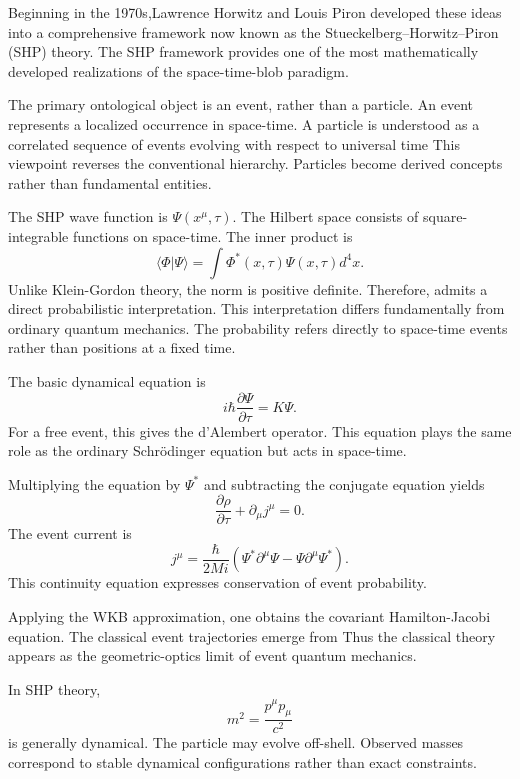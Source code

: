 Beginning in the 1970s,Lawrence Horwitz and Louis Piron developed these 
ideas into a comprehensive framework now known as the 
Stueckelberg--Horwitz--Piron (SHP) theory.
The SHP framework provides one of the most mathematically developed realizations
of the space-time-blob paradigm.

The primary ontological object is an event,
rather than a particle.
An event represents a localized occurrence in space-time.
A particle is understood as a correlated sequence of events evolving with respect to universal time
This viewpoint reverses the conventional hierarchy.
Particles become derived concepts rather than fundamental entities.

The SHP wave function is $\Psi(x^\mu,\tau).$
The Hilbert space consists of square-integrable functions on space-time.
The inner product is
\[
\langle \Phi | \Psi \rangle = \int \Phi^*(x,\tau)\Psi(x,\tau)d^4x.
\]
Unlike Klein-Gordon theory, the norm is positive definite.
Therefore,
admits a direct probabilistic interpretation.
This interpretation differs fundamentally from ordinary quantum mechanics.
The probability refers directly to space-time events rather than positions 
at a fixed time.

The basic dynamical equation is
\begin{equation}
    \label{shp-sch}
i\hbar \frac{\partial \Psi}{\partial \tau} = K \Psi.
\end{equation}
For a free event,
this gives the d'Alembert operator.
This equation plays the same role as the ordinary Schrödinger 
equation but acts in space-time.

Multiplying the equation by $\Psi^*$
and subtracting the conjugate equation yields
\[
\frac{\partial \rho}{\partial \tau}+\partial_\mu j^\mu=0.
\]
The event current is
\begin{equation}
    \label{shp-cur}
j^\mu=\frac{\hbar}{2Mi}\left(\Psi^*\partial^\mu\Psi-\Psi\partial^\mu\Psi^*\right).
\end{equation}
This continuity equation expresses conservation of event probability.

Applying the WKB approximation,
one obtains
 the covariant Hamilton-Jacobi equation.
The classical event trajectories emerge from
Thus the classical theory appears as the geometric-optics limit of event quantum mechanics.

In SHP theory,
\[
m^2 =\frac{p^\mu p_\mu}{c^2}
\]
is generally dynamical.
The particle may evolve off-shell.
Observed masses correspond to stable dynamical configurations rather 
than exact constraints.

